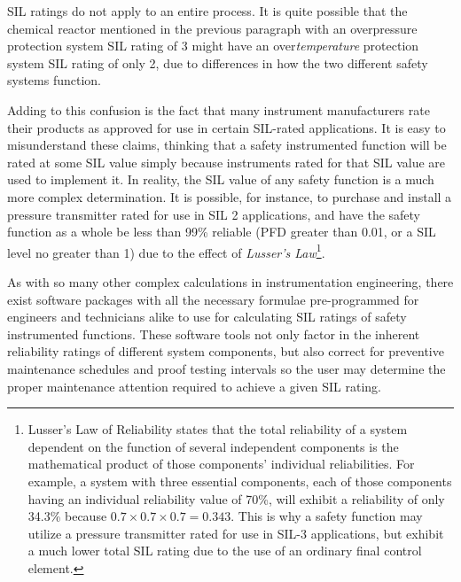 SIL ratings do not apply to an entire process.  It is quite possible that the chemical reactor mentioned in the previous paragraph with an overpressure protection system SIL rating of 3 might have an over\textit{temperature} protection system SIL rating of only 2, due to differences in how the two different safety systems function.

Adding to this confusion is the fact that many instrument manufacturers rate their products as approved for use in certain SIL-rated applications.  It is easy to misunderstand these claims, thinking that a safety instrumented function will be rated at some SIL value simply because instruments rated for that SIL value are used to implement it.  In reality, the SIL value of any safety function is a much more complex determination.  It is possible, for instance, to purchase and install a pressure transmitter rated for use in SIL 2 applications, and have the safety function as a whole be less than 99\% reliable (PFD greater than 0.01, or a SIL level no greater than 1) due to the effect of \textit{Lusser's Law}\footnote{Lusser's Law of Reliability states that the total reliability of a system dependent on the function of several independent components is the mathematical product of those components' individual reliabilities.  For example, a system with three essential components, each of those components having an individual reliability value of 70\%, will exhibit a reliability of only 34.3\% because $0.7 \times 0.7 \times 0.7 = 0.343$.  This is why a safety function may utilize a pressure transmitter rated for use in SIL-3 applications, but exhibit a much lower total SIL rating due to the use of an ordinary final control element.}.  

\vskip 10pt

As with so many other complex calculations in instrumentation engineering, there exist software packages with all the necessary formulae pre-programmed for engineers and technicians alike to use for calculating SIL ratings of safety instrumented functions.  These software tools not only factor in the inherent reliability ratings of different system components, but also correct for preventive maintenance schedules and proof testing intervals so the user may determine the proper maintenance attention required to achieve a given SIL rating.


